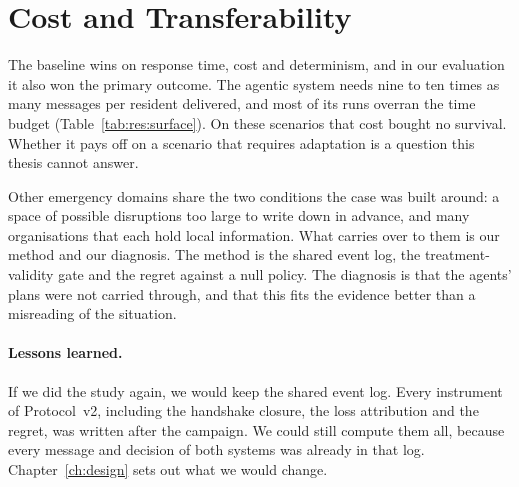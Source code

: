 \section{Cost and Transferability}
\label{sec:disc:tradeoffs}

The baseline wins on response time, cost and determinism, and in our
evaluation it also won the primary outcome. The agentic system needs nine to
ten times as many messages per resident delivered, and most of its runs
overran the time budget (Table~\ref{tab:res:surface}). On these scenarios that
cost bought no survival. Whether it pays off on a scenario that requires
adaptation is a question this thesis cannot answer.

Other emergency domains share the two conditions the case was built around: a
space of possible disruptions too large to write down in advance, and many
organisations that each hold local information. What carries over to them is
our method and our diagnosis. The method is the shared event log, the
treatment-validity gate and the regret against a null policy. The diagnosis is
that the agents' plans were not carried through, and that this fits the
evidence better than a misreading of the situation.

\paragraph{Lessons learned.}\label{sec:disc:lessons} If we did the study again,
we would keep the shared event log. Every instrument of Protocol~v2, including
the handshake closure, the loss attribution and the regret, was written after
the campaign. We could still compute them all, because every message and
decision of both systems was already in that log. Chapter~\ref{ch:design} sets
out what we would change.
